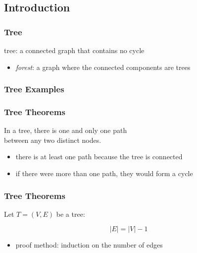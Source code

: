 \documentclass[dvipsnames]{beamer}
\begin{document}
\subsection{Introduction}

\begin{frame}
  \frametitle{Tree}

  \begin{definition}
    \alert{tree}: a connected graph that contains no cycle
  \end{definition}

  \pause
  \begin{itemize}
    \item \emph{forest}: a graph where the connected components are trees
  \end{itemize}
\end{frame}

\begin{frame}
  \frametitle{Tree Examples}

  \begin{example}
    \begin{center}
    \end{center}
  \end{example}
\end{frame}

\begin{frame}
  \frametitle{Tree Theorems}

  \begin{theorem}
    In a tree, there is one and only one path\\
    between any two distinct nodes.
  \end{theorem}

  \begin{itemize}
    \item there is at least one path because the tree is connected
    \item if there were more than one path, they would form a cycle
    \medskip
    \begin{center}
    \end{center}
  \end{itemize}
\end{frame}

\begin{frame}
  \frametitle{Tree Theorems}

  \begin{theorem}
    Let $T=(V,E)$ be a tree:

    \[|E| = |V| - 1\]
  \end{theorem}

  \begin{itemize}
    \item proof method: induction on the number of edges
  \end{itemize}
\end{frame}
\end{document}
